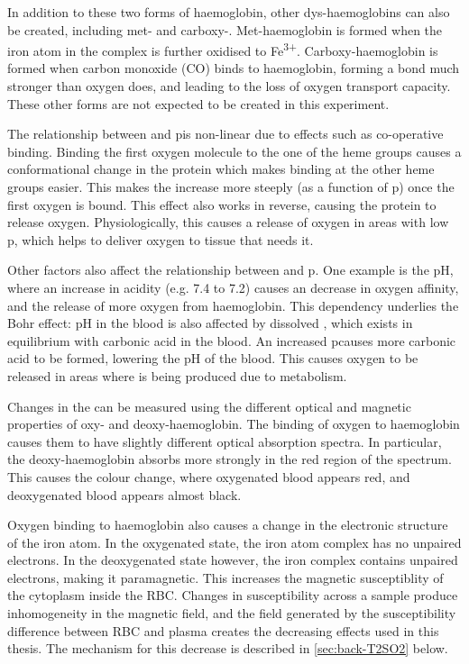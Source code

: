 In addition to these two forms of haemoglobin, other dys-haemoglobins can also be created, including met- and carboxy-.
Met-haemoglobin is formed when the iron atom in the complex is further oxidised to Fe\textsuperscript{3+}.
Carboxy-haemoglobin is formed when carbon monoxide (CO) binds to haemoglobin, forming a bond much stronger than oxygen does, and leading to the loss of oxygen transport capacity.
These other forms are not expected to be created in this experiment.

The relationship between \SOtwo and p\Otwo is non-linear due to effects such as co-operative binding.
Binding the first oxygen molecule to the one of the heme groups causes a conformational change in the protein which makes binding at the other heme groups easier.
This makes the \SOtwo increase more steeply (as a function of p\Otwo) once the first oxygen is bound.
This effect also works in reverse, causing the protein to release oxygen.
Physiologically, this causes a release of oxygen in areas with low p\Otwo, which helps to deliver oxygen to tissue that needs it.

Other factors also affect the relationship between \SOtwo and p\Otwo. \cite{HallGuytonHallTextbook2015}
One example is the pH, where an increase in acidity (e.g. 7.4 to 7.2) causes an decrease in oxygen affinity, and the release of more oxygen from haemoglobin.
This dependency underlies the Bohr effect:
pH in the blood is also affected by dissolved \COtwo, which exists in equilibrium with carbonic acid in the blood.
An increased p\COtwo causes more carbonic acid to be formed, lowering the pH of the blood.
This causes oxygen to be released in areas where \COtwo is being produced due to metabolism.

Changes in the \SOtwo can be measured using the different optical and magnetic properties of oxy- and deoxy-haemoglobin.
The binding of oxygen to haemoglobin causes them to have slightly different optical absorption spectra.
In particular, the deoxy-haemoglobin absorbs more strongly in the red region of the spectrum.
This causes the colour change, where oxygenated blood appears red, and deoxygenated blood appears almost black.

Oxygen binding to haemoglobin also causes a change in the electronic structure of the iron atom. \cite{PaulingMagneticPropertiesStructure1936}
In the oxygenated state, the iron atom complex has no unpaired electrons.
In the deoxygenated state however, the iron complex contains unpaired electrons, making it paramagnetic.
This increases the magnetic susceptiblity of the cytoplasm inside the RBC.
Changes in susceptibility across a sample produce inhomogeneity in the \Bzero magnetic field, and the field generated by the susceptibility difference between RBC and plasma creates the decreasing \Ttwo effects used in this thesis.
The mechanism for this decrease is described in \autoref{sec:back-T2SO2} below.


